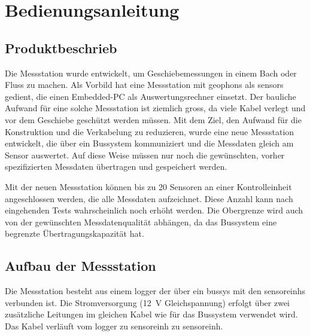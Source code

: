 %
%

\chapter{Bedienungsanleitung}\label{chap.bedienung}

\section{Produktbeschrieb}\label{sec.manualproduct}
Die Messstation wurde entwickelt, um Geschiebemessungen in einem Bach oder Fluss zu machen. Als Vorbild hat eine Messstation mit \glspl{geophon} als \glspl{sensor} gedient, die einen Embedded-PC als Auswertungsrechner einsetzt. Der bauliche Aufwand für eine solche Messstation ist ziemlich gross, da viele Kabel verlegt und vor dem Geschiebe geschützt werden müssen. Mit dem Ziel, den Aufwand für die Konstruktion und die Verkabelung zu reduzieren, wurde eine neue Messstation entwickelt, die über ein Bussystem kommuniziert und die Messdaten gleich am Sensor auswertet. Auf diese Weise müssen nur noch die gewünschten, vorher spezifizierten Messdaten übertragen und gespeichert werden.

Mit der neuen Messstation können bis zu 20 Sensoren an einer Kontrolleinheit angeschlossen werden, die alle Messdaten aufzeichnet. Diese Anzahl kann nach eingehenden Tests wahrscheinlich noch erhöht werden. Die Obergrenze wird auch von der gewünschten Messdatenqualität abhängen, da das Bussystem eine begrenzte Übertragungskapazität hat.









\section{Aufbau der Messstation}\label{sec.manualoverview}
Die Messstation besteht aus einem \gls{logger} der über ein \gls{bussys} mit den \glspl{sensoreinh} verbunden ist. Die Stromversorgung (12~V Gleichspannung) erfolgt über zwei zusätzliche Leitungen im gleichen Kabel wie für das Bussystem verwendet wird. Das Kabel verläuft vom \gls{logger} zu \gls{sensoreinh} zu \gls{sensoreinh}.

